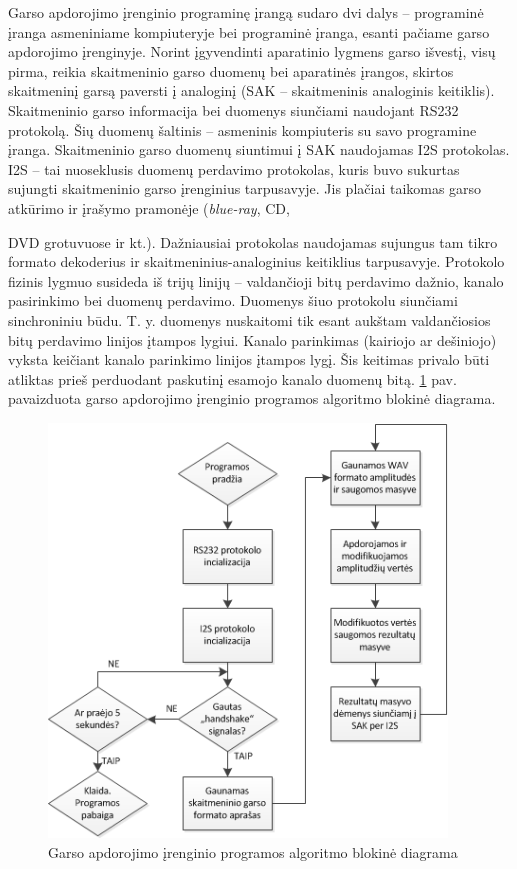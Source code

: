\documentclass[]{vgtuef}
\begin{document}
Garso apdorojimo įrenginio programinę įrangą sudaro dvi dalys – programinė įranga asmeniniame kompiuteryje bei programinė įranga, esanti pačiame garso apdorojimo įrenginyje. Norint įgyvendinti aparatinio lygmens garso išvestį, visų pirma, reikia skaitmeninio garso duomenų bei aparatinės įrangos, skirtos skaitmeninį garsą paversti į analoginį (SAK – skaitmeninis analoginis keitiklis). Skaitmeninio garso informacija bei duomenys siunčiami naudojant RS232 protokolą. Šių duomenų šaltinis – asmeninis kompiuteris su savo programine įranga. Skaitmeninio garso duomenų siuntimui į SAK naudojamas I2S protokolas. I2S – tai nuoseklusis duomenų perdavimo protokolas, kuris buvo sukurtas sujungti skaitmeninio garso įrenginius tarpusavyje. Jis plačiai taikomas garso atkūrimo ir įrašymo pramonėje (\textit{blue-ray}, CD, {DVD grotuvuose ir kt.). Dažniausiai protokolas naudojamas sujungus tam tikro formato dekoderius ir skaitmeninius-analoginius keitiklius tarpusavyje. Protokolo fizinis lygmuo susideda iš trijų linijų – valdančioji bitų perdavimo dažnio, kanalo pasirinkimo bei duomenų perdavimo. Duomenys šiuo protokolu siunčiami sinchroniniu būdu. T. y. duomenys nuskaitomi tik esant aukštam valdančiosios bitų perdavimo linijos įtampos lygiui. Kanalo parinkimas (kairiojo ar dešiniojo) vyksta keičiant kanalo parinkimo linijos įtampos lygį. Šis keitimas privalo būti atliktas prieš perduodant paskutinį esamojo kanalo duomenų bitą. \ref{fig:garso_apdorojimas} pav. pavaizduota garso apdorojimo įrenginio programos algoritmo blokinė diagrama.

\begin{figure}[!ht]
  \centering
  \includegraphics[width=400px]{img/garso_apdorojimas.png}
  \caption{Garso apdorojimo įrenginio programos algoritmo blokinė diagrama}
  \label{fig:garso_apdorojimas}
\end{figure}

}
\end{document}
